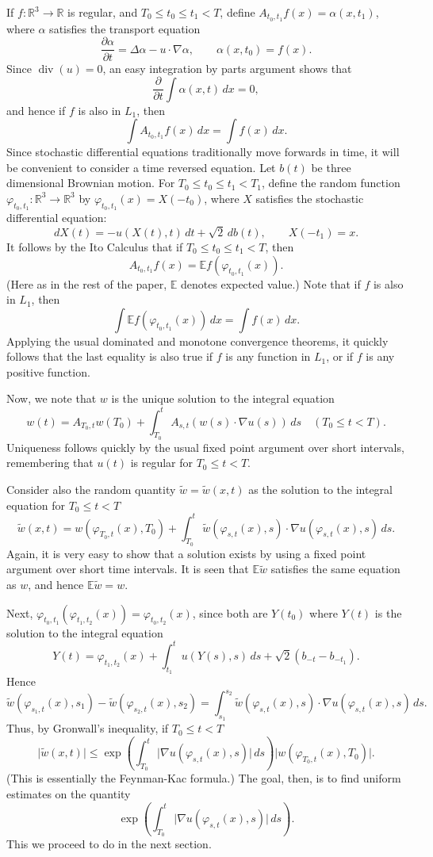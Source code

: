 \documentclass[12pt]{amsart}
\theoremstyle{remark}
\newcommand{\E}{{\mathbb E}}
\newcommand{\R}{{\mathbb R}}
\newcommand{\smodo}[1]{{\mathopen|#1\mathclose|}}
\DeclareMathOperator{\divergence}{div}
\begin{document}
If $f\colon\R^3 \to \R$ is regular, and
$T_0 \le t_0 \le t_1 < T$,
define $A_{t_0,t_1} f(x) = \alpha(x,t_1)$, where 
$\alpha$ satisfies the transport equation
$$ \frac{\partial\alpha}{\partial t} = \Delta \alpha - u\cdot\nabla \alpha,
   \qquad
   \alpha(x,t_0) = f(x) .$$
Since $\divergence(u) = 0$, an easy integration by parts argument shows
that
$$ \frac\partial{\partial t} \int \alpha(x,t) \, dx = 0 ,$$
and hence if $f$ is also in $L_1$, then
$$ \int A_{t_0,t_1} f(x) \, dx = \int f(x) \, dx .$$
Since stochastic
differential equations traditionally move forwards in time, it will be 
convenient to consider a time reversed equation.
Let $b(t)$ be three dimensional Brownian motion.
For $T_0 \le t_0 \le t_1 < T_1$, define the random function
$\varphi_{t_0,t_1}\colon\R^3\to\R^3$ by
$\varphi_{t_0,t_1}(x) = X(-t_0)$, where $X$ satisfies the 
stochastic differential equation:
$$ dX(t) = -u(X(t),t) \, dt + \sqrt2 \, db(t),
   \qquad
   X(-t_1) = x .$$
It follows by the Ito Calculus \cite{karatzas-shreve} that
if $T_0 \le t_0 \le t_1 < T$, then
$$ A_{t_0,t_1} f(x) = \E f(\varphi_{t_0,t_1}(x)) .$$
(Here as in the rest of the paper, $\E$ denotes expected value.)
Note that if $f$ is also in $L_1$, then
$$ \int \E f(\varphi_{t_0,t_1}(x)) \, dx = \int f(x) \, dx .$$
Applying the usual dominated and monotone convergence theorems, it
quickly follows that the last equality is also true if $f$ is any
function in $L_1$, or if $f$
is any positive function.

Now, we note that $w$ is the unique solution to the integral
equation
$$ w(t) = A_{T_0,t} w(T_0) + 
   \int_{T_0}^t A_{s,t} (w(s) \cdot \nabla u(s)) \, ds 
   \quad (T_0 \le t < T).$$
Uniqueness follows quickly by the usual fixed point argument
over short intervals, 
remembering that $u(t)$ is regular for $T_0 \le t < T$.

Consider also the random quantity
$\tilde w = \tilde w(x,t)$ as the solution to the integral equation
for $T_0 \le t < T$
$$ \tilde w(x,t) = w(\varphi_{T_0,t}(x),T_0) +
   \int_{T_0}^t \tilde 
   w(\varphi_{s,t}(x),s) \cdot \nabla u(\varphi_{s,t}(x),s) \, ds .$$
Again, 
it is very easy to show that a solution exists by using a fixed point
argument over short time intervals.
It is seen that $\E\tilde w$ satisfies the same equation as $w$, and
hence $\E \tilde w = w$.

Next, 
$\varphi_{t_0,t_1}(\varphi_{t_1,t_2}(x)) = \varphi_{t_0,t_2}(x)$,
since both are $Y(t_0)$ where $Y(t)$ is the solution to the integral equation
$$ Y(t) = \varphi_{t_1,t_2}(x) + \int_{t_1}^{t} u(Y(s),s)\, ds
       + \sqrt 2(b_{-t}-b_{-t_1}) .$$
Hence
$$ \tilde w(\varphi_{s_1,t}(x),s_1) - \tilde w(\varphi_{s_2,t}(x),s_2)
   =
   \int_{s_1}^{s_2} \tilde 
   w(\varphi_{s,t}(x),s) \cdot \nabla u(\varphi_{s,t}(x),s) \, ds .$$
Thus,
by Gronwall's inequality, if $T_0 \le t < T$
$$ \smodo{\tilde w(x,t)}
   \le
   \exp\left(\int_{T_0}^t \smodo{\nabla u(\varphi_{s,t}(x),s)} \, ds\right)
   \smodo{w(\varphi_{T_0,t}(x),T_0)} .$$
(This is essentially the Feynman-Kac formula.)
The goal, then, is to find uniform estimates on the quantity
$$ \exp\left(\int_{T_0}^t \smodo{\nabla u(\varphi_{s,t}(x),s)} \, ds\right) .$$
This we proceed to do in the next section.
\end{document}
